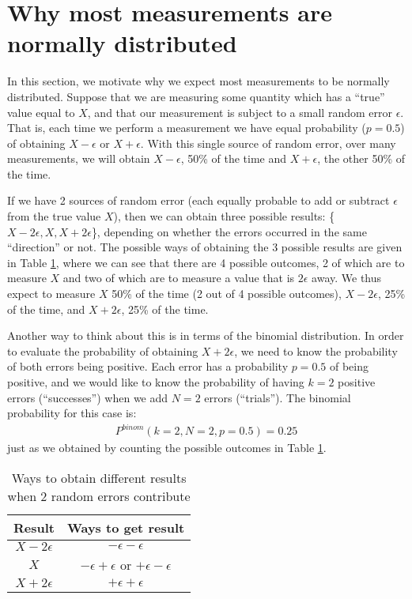 \section{Why most measurements are normally distributed}
In this section, we motivate why we expect most measurements to be normally distributed. Suppose that we are measuring some quantity which has a ``true'' value equal to $X$, and that our measurement is subject to a small random error $\epsilon$. That is, each time we perform a measurement we have equal probability ($p=0.5$) of obtaining $X-\epsilon$ or $X+\epsilon$. With this single source of random error, over many measurements, we will obtain $X-\epsilon$, 50\% of the time and $X+\epsilon$, the other 50\% of the time.

 If we have 2 sources of random error (each equally probable to add or subtract $\epsilon$ from the true value $X$), then we can obtain three possible results: \{$X-2\epsilon,X,X+2\epsilon$\}, depending on whether the errors occurred in the same ``direction'' or not. The possible ways of obtaining the 3 possible results are given in Table \ref{tab:twoerrors}, where we can see that there are 4 possible outcomes, 2 of which are to measure $X$ and two of which are to measure a value that is $2\epsilon$ away. We thus expect to measure $X$ 50\% of the time (2 out of 4 possible outcomes), $X-2\epsilon$, 25\% of the time, and $X+2\epsilon$, 25\% of the time.  

Another way to think about this is in terms of the binomial distribution. In order to evaluate the probability of obtaining $X+2\epsilon$, we need to know the probability of both errors being positive. Each error has a probability $p=0.5$ of being positive, and we would like to know the probability of having $k=2$ positive errors (``successes'') when we add $N=2$ errors (``trials''). The binomial probability for this case is:
\begin{align*}
P^{binom}(k=2,N=2,p=0.5)=0.25
\end{align*} 
just as we obtained by counting the possible outcomes in Table \ref{tab:twoerrors}.
\begin{table}
\center
\begin{tabular}{|c|c|}
\hline
\textbf{Result} & \textbf{Ways to get result}\\
\hline
$X-2\epsilon$ & $-\epsilon-\epsilon$\\
$X$ & $-\epsilon+\epsilon$ or $+\epsilon-\epsilon$\\
$X+2\epsilon$ & $+\epsilon+\epsilon$\\
\hline
\end{tabular}
\caption{\label{tab:twoerrors}Ways to obtain different results when 2 random errors contribute}
\end{table}

